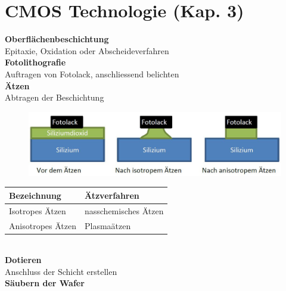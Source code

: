 
\section{CMOS Technologie (Kap. 3)}

\begin{minipage}[t]{0.5\textwidth}
	\textbf{Oberflächenbeschichtung}\\
	Epitaxie, Oxidation oder Abscheideverfahren\\ [2ex]
	\textbf{Fotolithografie}\\
	Auftragen von Fotolack, anschliessend belichten\\ [2ex]
	\textbf{Ätzen}\\
	Abtragen der Beschichtung
	\begin{figure}[H]
		\includegraphics[width=0.8\linewidth]{chapters/Technologie/images/Aetzen}
	\end{figure}
	\begin{tabular}{|l|l|}
		\hline
		\textbf{Bezeichnung}&\textbf{Ätzverfahren}\\ \hline
		Isotropes Ätzen&nasschemisches Ätzen\\ \hline
		Anisotropes Ätzen&Plasmaätzen\\ \hline
	\end{tabular}\\ [2ex]
	\textbf{Dotieren}\\
	Anschluss der Schicht erstellen\\ [2ex]
	\textbf{Säubern der Wafer}\\
\end{minipage}
